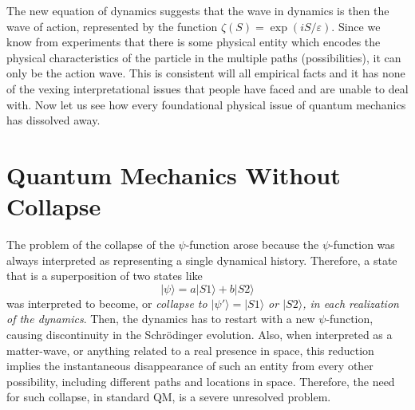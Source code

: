 The new equation of dynamics suggests that the wave in dynamics is then the wave
of action, represented by the function $\zeta (S) = \exp(iS/\varepsilon)$. Since we know from experiments
that there is some physical entity which encodes the physical characteristics of the particle
in the multiple paths (possibilities), it can only be the action wave. This is consistent will
all empirical facts and it has none of the vexing interpretational issues that people have
faced and are unable to deal with. Now let us see how every foundational physical issue of
quantum mechanics has dissolved away.

\section{Quantum Mechanics Without Collapse}\label{c14-sec5}

The problem of the collapse of the $\psi$-function arose because the $\psi$-function was always
interpreted as representing a single dynamical history. Therefore, a state that is a superposition of two states like
\begin{equation*}
|\psi \rangle = a |S1 \rangle + b |S2 \rangle \tag{28}\label{c14-eq28}
\end{equation*}
was interpreted to become, or \textit{collapse to $|\psi' \rangle = |S1 \rangle$  or $|S2 \rangle$, in each realization of the
dynamics}. Then, the dynamics has to restart with a new $\psi$-function, causing discontinuity
in the Schr\"{o}dinger evolution. Also, when interpreted as a matter-wave, or anything related to a real presence in space, this reduction implies the instantaneous disappearance of such an entity from every other possibility, including different paths and locations in space. 
Therefore, the need for such collapse, in standard QM, is a severe unresolved problem.

